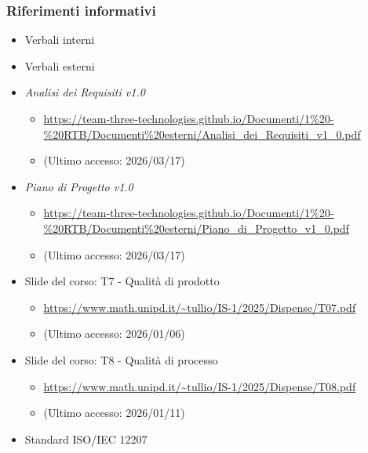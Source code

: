 \documentclass[a4paper,12pt]{article}
\begin{document}
{            \subsubsection{Riferimenti informativi}
                \begin{itemize}
                    \item Verbali interni
                    \item Verbali esterni
                    \item \textit{Analisi dei Requisiti v1.0}
                    \begin{itemize}
                        \item \url{https://team-three-technologies.github.io/Documenti/1%20-%20RTB/Documenti%20esterni/Analisi_dei_Requisiti_v1_0.pdf}
                        \item[] (Ultimo accesso: 2026/03/17)
                    \end{itemize}
                    \item \textit{Piano di Progetto v1.0}
                    \begin{itemize}
                        \item \url{https://team-three-technologies.github.io/Documenti/1%20-%20RTB/Documenti%20esterni/Piano_di_Progetto_v1_0.pdf}
                        \item[] (Ultimo accesso: 2026/03/17)
                    \end{itemize}
                    \item Slide del corso: T7 - Qualità di prodotto
                    \begin{itemize}
                        \item \url{https://www.math.unipd.it/~tullio/IS-1/2025/Dispense/T07.pdf}
                         \item[] (Ultimo accesso: 2026/01/06)
                    \end{itemize}
                    \item Slide del corso: T8 - Qualità di processo
                    \begin{itemize}
                        \item \url{https://www.math.unipd.it/~tullio/IS-1/2025/Dispense/T08.pdf}
                        \item[] (Ultimo accesso: 2026/01/11)
                    \end{itemize}
                    \item Standard ISO/IEC 12207

\end{itemize}}
\end{document}
